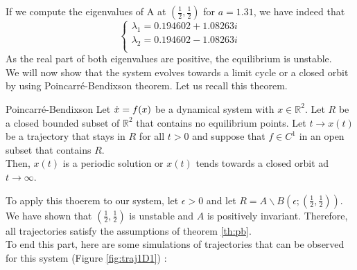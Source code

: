 \documentclass{article}
\begin{document}
If we compute the eigenvalues of A at $(\frac{1}{2}, \frac{1}{2})$ for $a=1.31$, we have indeed that
\[
\begin{cases}
\lambda_1 = 0.194602+1.08263i \\
\lambda_2 = 0.194602-1.08263i \\
\end{cases}
\]
As the real part of both eigenvalues are positive, the equilibrium is unstable. \\
We will now show that the system evolves towards a limit cycle or a closed orbit by using Poincarré-Bendixson theorem.
Let us recall this theorem. \\

\begin{theorem}{Poincarré-Bendixson}
\label{th:pb}
Let $\dot{x} = f(x)$ be a dynamical system with $x \in \mathbb{R}^2$. Let $R$ be a closed bounded subset of $\mathbb{R}^2$ that contains no equilibrium points. Let $t\rightarrow x(t)$ be a trajectory that stays in $R$ for all $t > 0$ and suppose that $f \in C^1$ in an open subset that contains $R$.\\
Then, $x(t)$ is a periodic solution or $x(t)$ tends towards a closed orbit ad $t \rightarrow \infty$.
\end{theorem}

To apply this thoerem to our system, let $\epsilon > 0$ and let $R = A \backslash B(\epsilon;(\frac{1}{2},\frac{1}{2}))$. We have shown that $(\frac{1}{2},\frac{1}{2})$ is unstable and $A$ is positively invariant. Therefore, all trajectories satisfy the assumptions of theorem \ref{th:pb}. \\

To end this part, here are some simulations of trajectories that can be observed for this system (Figure \ref{fig:traj1D1}) :
\end{document}
